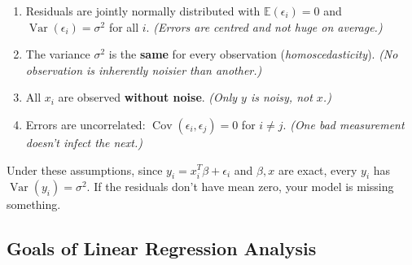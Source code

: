 \documentclass{article}
\begin{document}
\begin{enumerate}
  \item Residuals are jointly normally distributed with $\mathbb{E}(\epsilon_i) = 0$
        and $\operatorname{Var}(\epsilon_i) = \sigma^2$ for all $i$.
        \textit{(Errors are centred and not huge on average.)}
  \item The variance $\sigma^2$ is the \textbf{same} for every observation
        (\textit{homoscedasticity}). \textit{(No observation is inherently
        noisier than another.)}
  \item All $x_i$ are observed \textbf{without noise}. \textit{(Only $y$ is
        noisy, not $x$.)}
  \item Errors are uncorrelated: $\operatorname{Cov}(\epsilon_i, \epsilon_j) = 0$
        for $i \neq j$. \textit{(One bad measurement doesn't infect the next.)}
\end{enumerate}

Under these assumptions, since $y_i = x_i^T\beta + \epsilon_i$ and $\beta,x$ are
exact, every $y_i$ has $\operatorname{Var}(y_i)=\sigma^2$.
If the residuals don't have mean zero, your model is missing something.

\subsection{Goals of Linear Regression Analysis}
\end{document}
